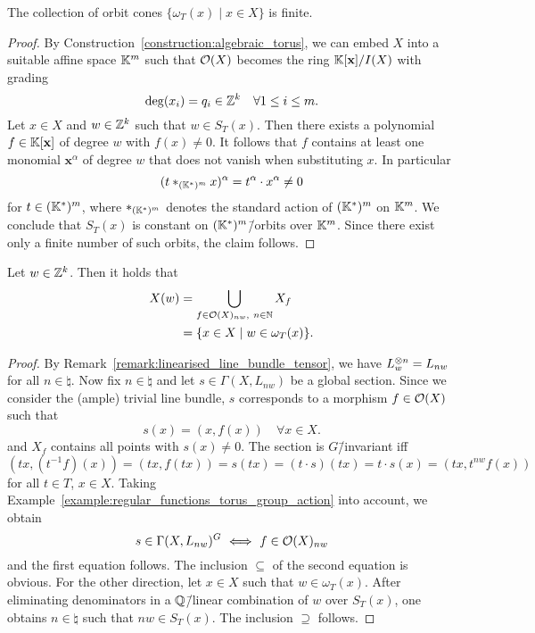 \begin{prop}
	\label{prop:finite_orbit_cones}
	The collection of orbit cones $\{\omega_T(x)\mid x\in X\}$ is finite.
\end{prop}
\begin{proof}
	By Construction~\ref{construction:algebraic_torus}, we can embed $X$ into a suitable affine space $\mathbb{K}^m$ such that $\mathcal{O}(X)$ becomes the ring $\mathbb{K}[\mathbf{x}]/I(X)$ with grading
	$$\deg(x_i) = q_i\in\mathbb{Z}^k\quad\forall 1\leq i \leq m.$$
	Let $x\in X$ and $w\in\mathbb{Z}^k$ such that $w\in S_T(x)$. Then there exists a polynomial $f\in\mathbb{K}[\mathbf{x}]$ of degree $w$ with $f(x)\neq 0$. It follows that $f$ contains at least one monomial $\mathbf{x}^\alpha$ of degree $w$ that does not vanish when substituting $x$. In particular
	$$(t *_{(\mathbb{K}^*)^m} x)^\alpha = t^\alpha \cdot x^\alpha \neq 0$$
	for $t\in(\mathbb{K}^*)^m$, where $*_{(\mathbb{K}^*)^m}$ denotes the standard action of $(\mathbb{K}^*)^m$ on $\mathbb{K}^m$. We conclude that $S_T(x)$ is constant on $(\mathbb{K}^*)^m$\=/orbits over $\mathbb{K}^m$. Since there exist only a finite number of such orbits, the claim follows.
\end{proof}

\begin{lemma} Let $w\in\mathbb{Z}^k$. Then it holds that
	\label{lemma:semistable_points_determined_by_orbit_cones}
	\begin{align*}
	X(w) 
	&= \bigcup_{f\in\mathcal{O}(X)_{nw},\ n\in\mathbb{N}} X_f\\
	&= \{x\in X\mid w\in\omega_T(x)\}.
	\end{align*}
\end{lemma}
\begin{proof}
	By Remark~\ref{remark:linearised_line_bundle_tensor}, we have $L_w^{\otimes n} = L_{nw}$ for all $n\in\natural$. Now fix $n\in\natural$ and let $s\in\Gamma(X,L_{nw})$ be a global section. Since we consider the (ample) trivial line bundle, $s$ corresponds to a morphism $f\in\mathcal{O}(X)$ such that
	$$s(x) = (x, f(x))\quad \forall x\in X.$$
	and $X_f$ contains all points with $s(x) \neq 0$. The section is $G$\=/invariant iff
	$$(tx, (t^{-1}f)(x)) = (tx, f(tx)) = s(tx) = (t\cdot s)(tx) = t\cdot s(x) = (tx, t^{nw} f(x))$$
	for all $t\in T$, $x\in X$. Taking Example~\ref{example:regular_functions_torus_group_action} into account, we obtain
	$$s\in\Gamma(X,L_{nw})^G \ \Longleftrightarrow\ f\in\O(X)_{nw}$$
	and the first equation follows. The inclusion $\subseteq$ of the second equation is obvious. For the other direction, let $x\in X$ such that $w\in\omega_T(x)$. After eliminating denominators in a $\mathbb{Q}$\=/linear combination of $w$ over $S_T(x)$, one obtains $n\in\natural$ such that $nw \in S_T(x)$. The inclusion $\supseteq$ follows.
\end{proof}

